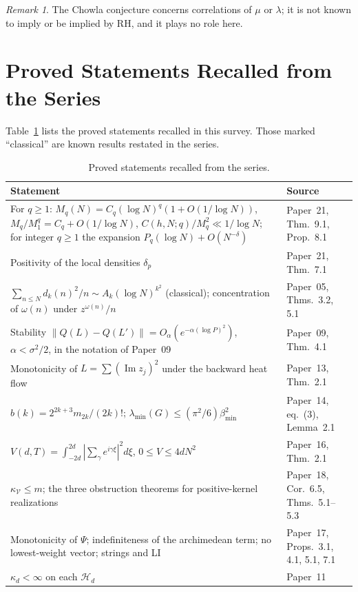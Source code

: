 \documentclass[11pt]{amsart}
\theoremstyle{definition}
\theoremstyle{remark}
\newtheorem{remark}[theorem]{Remark}
\renewcommand{\Im}{\operatorname{Im}}
\newcommand{\om}{\omega}
\newcommand{\kap}{\kappa}
\newcommand{\gam}{\gamma}
\newcommand{\kV}{\kappa_{\mathcal V}}
\begin{document}
\begin{remark}
The Chowla conjecture concerns correlations of $\mu$ or $\lambda$; it is not known to
imply or be implied by RH, and it plays no role here.
\end{remark}

\section{Proved Statements Recalled from the Series}
\label{sec:new}

Table~\ref{tab:new-results} lists the proved statements recalled in this survey. Those
marked ``classical'' are known results restated in the series.

\begin{table}[h]
\small
\renewcommand{\arraystretch}{1.3}
\centering
\begin{tabularx}{\textwidth}{>{\raggedright\arraybackslash}X>{\raggedright\arraybackslash}p{3.3cm}}
\toprule
Statement & Source \\
\midrule
For $q\ge1$: $M_q(N)=C_q(\log N)^q(1+O(1/\log N))$, $M_q/M_1^q=C_q+O(1/\log N)$, $C(h,N;q)/M_q^2\ll1/\log N$; for integer $q\ge1$ the expansion $P_q(\log N)+O(N^{-\delta})$ & Paper~21, Thm.~9.1, Prop.~8.1 \\
Positivity of the local densities $\delta_p$ & Paper~21, Thm.~7.1 \\
$\sum_{n\le N}d_k(n)^2/n\sim A_k(\log N)^{k^2}$ (classical); concentration of $\om(n)$ under $z^{\om(n)}/n$ & Paper~05, Thms.~3.2, 5.1 \\
Stability $\|Q(L)-Q(L')\|=O_\alpha(e^{-\alpha(\log P)^2})$, $\alpha<\sigma^2/2$, in the notation of Paper~09 & Paper~09, Thm.~4.1 \\
Monotonicity of $L=\sum(\Im z_j)^2$ under the backward heat flow & Paper~13, Thm.~2.1 \\
$b(k)=2^{2k+3}m_{2k}/(2k)!$; $\lambda_{\min}(G)\le(\pi^2/6)\beta_{\min}^2$ & Paper~14, eq.~(3), Lemma~2.1 \\
$V(d,T)=\int_{-2d}^{2d}|\sum_\gam e^{i\gam\xi}|^2d\xi$, $0\le V\le4dN^2$ & Paper~16, Thm.~2.1 \\
$\kV\le m$; the three obstruction theorems for positive-kernel realizations & Paper~18, Cor.~6.5, Thms.~5.1--5.3 \\
Monotonicity of $\Psi$; indefiniteness of the archimedean term; no lowest-weight vector; strings and LI & Paper~17, Props.~3.1, 4.1, 5.1, 7.1 \\
$\kap_d<\infty$ on each $\mathcal H_d$ & Paper~11~\cite[Prop.~2.1 and Rem.~2.2]{P11} \\
\bottomrule
\end{tabularx}
\caption{Proved statements recalled from the series.}
\label{tab:new-results}
\end{table}
\end{document}
